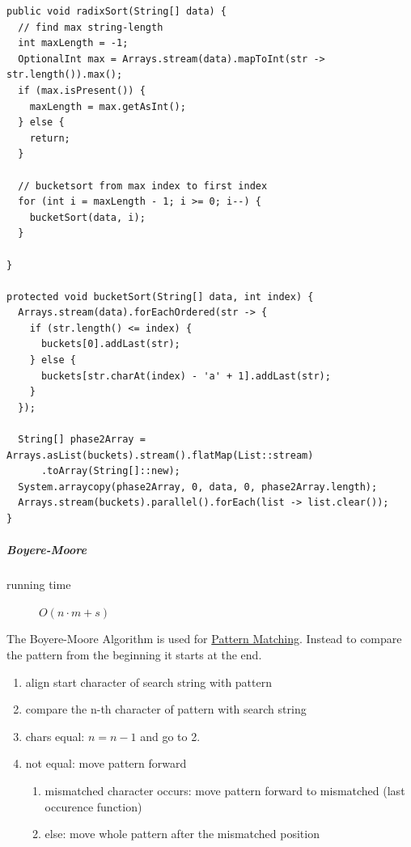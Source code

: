 \documentclass[11pt,twoside,twocolumn,landscape]{article}
\begin{document}
\lstset{language=java,label= ,caption= ,captionpos=b,numbers=none}
\begin{lstlisting}
public void radixSort(String[] data) {
  // find max string-length
  int maxLength = -1;
  OptionalInt max = Arrays.stream(data).mapToInt(str -> str.length()).max();
  if (max.isPresent()) {
    maxLength = max.getAsInt();
  } else {
    return;
  }

  // bucketsort from max index to first index
  for (int i = maxLength - 1; i >= 0; i--) {
    bucketSort(data, i);
  }

}

protected void bucketSort(String[] data, int index) {
  Arrays.stream(data).forEachOrdered(str -> {
    if (str.length() <= index) {
      buckets[0].addLast(str);
    } else {
      buckets[str.charAt(index) - 'a' + 1].addLast(str);
    }
  });

  String[] phase2Array = Arrays.asList(buckets).stream().flatMap(List::stream)
      .toArray(String[]::new);
  System.arraycopy(phase2Array, 0, data, 0, phase2Array.length);
  Arrays.stream(buckets).parallel().forEach(list -> list.clear());
}
\end{lstlisting}

\subparagraph{Boyere-Moore}
\label{sec:org4c38fd7}

\begin{description}
\item[{running time}] \(O(n\cdot m + s)\)
\end{description}

The Boyere-Moore Algorithm is used for \href{../../../roam/20211215163350-pattern_matching.org}{Pattern Matching}.
Instead to compare the pattern from the beginning it starts at the end.

\begin{enumerate}
\item align start character of search string with pattern
\item compare the n-th character of pattern with search string
\item chars equal: \(n = n-1\) and go to 2.
\item not equal: move pattern forward
\begin{enumerate}
\item mismatched character occurs: move pattern forward to mismatched (last occurence function)
\item else: move whole pattern after the mismatched position
\end{enumerate}
\end{enumerate}
\end{document}
